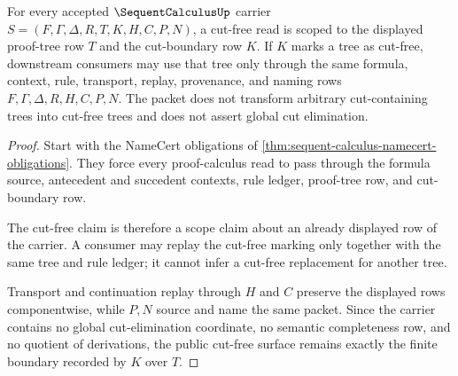 \begin{theorem}
\label{thm:sequent-calculus-cut-free-scope}
For every accepted $\SequentCalculusUp$ carrier $S=(F,\Gamma,\Delta,R,T,K,H,C,P,N)$, a cut-free read is scoped to the displayed proof-tree row $T$ and the cut-boundary row $K$. If $K$ marks a tree as cut-free, downstream consumers may use that tree only through the same formula, context, rule, transport, replay, provenance, and naming rows $F,\Gamma,\Delta,R,H,C,P,N$. The packet does not transform arbitrary cut-containing trees into cut-free trees and does not assert global cut elimination.
\end{theorem}
\begin{proof}
Start with the NameCert obligations of \autoref{thm:sequent-calculus-namecert-obligations}. They force every proof-calculus read to pass through the formula source, antecedent and succedent contexts, rule ledger, proof-tree row, and cut-boundary row.

The cut-free claim is therefore a scope claim about an already displayed row of the carrier. A consumer may replay the cut-free marking only together with the same tree and rule ledger; it cannot infer a cut-free replacement for another tree.

Transport and continuation replay through $H$ and $C$ preserve the displayed rows componentwise, while $P,N$ source and name the same packet. Since the carrier contains no global cut-elimination coordinate, no semantic completeness row, and no quotient of derivations, the public cut-free surface remains exactly the finite boundary recorded by $K$ over $T$.
\end{proof}


\begin{closurestatus}{\SequentCalculusUp}
  \theoryclosure{\seedClosure}
  \formalstatus{\unformalizedV}
\end{closurestatus}

